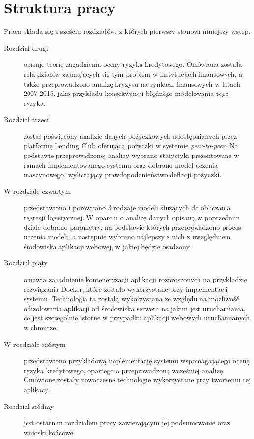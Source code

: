 \section{Struktura pracy}
Praca składa się z sześciu rozdziałów, z których pierwszy stanowi niniejszy wstęp.
\begin{description}
\item [Rozdział drugi] opisuje teorię zagadnienia oceny ryzyka kredytowego. Omówiona została rola działów zajmujących się tym problem w instytucjach finansowych, a także przeprowadzono analizę kryzysu na rynkach finansowych w latach 2007-2015, jako przykładu konsekwencji błędnego modelowania tego ryzyka. 
\item [Rozdział trzeci] został poświęcony analizie danych pożyczkowych udostępnianych przez platformę Lending Club oferującą pożyczki w systemie \textit{peer-to-peer}. Na podstawie przeprowadzonej analizy  wybrano statystyki prezentowane w ramach implementowanego systemu oraz dobrano model uczenia maszynowego, wyliczający prawdopodonieństwo deflacji pożyczki.
\item [W rozdziale czwartym] przedstawiono i porównano 3 rodzaje modeli służących do obliczania regresji logistycznej. W oparciu o analizę danych opisaną w poprzednim dziale dobrano parametry, na podstawie których przeprowadzono proces uczenia modeli, a następnie wybrano najlepszy z nich z uwzględniem środowiska aplikacji webowej, w jakiej będzie osadzony. 
\item [Rozdział piąty] omawia zagadnienie konteneryzacji aplikacji rozproszonych na przykładzie rozwiązania Docker, które  zostało wykorzystane przy implementacji systemu. Technologia ta zostałą wykorzystana ze względu na możliwość odizolowania aplikacji od środowiska serwera na jakim jest uruchamiania, co jest szczególnie istotne w przypadku aplikacji webowych uruchamianych w chmurze.
\item [W rozdziale szóstym] przedstawiono przykładową implementację systemu wspomagającego ocenę ryzyka kredytowego, opartego o przeprowadzoną wcześniej analizę. Omówione zostały nowoczesne technologie wykorzystane przy tworzeniu tej aplikacji.
\item [Rozdział siódmy] jest ostatnim rozdziałem pracy zawierającym jej podsumowanie oraz wnioski końcowe. 
\end{description}
 